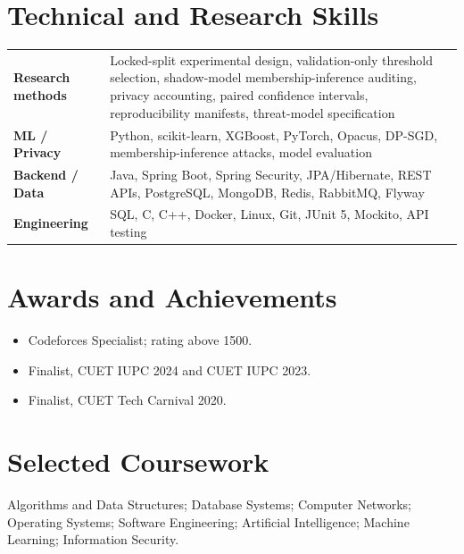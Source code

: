 \documentclass[11pt,letterpaper]{article}
\begin{document}
\section*{Technical and Research Skills}

\begin{tabularx}{\textwidth}{@{}>{\bfseries}p{} X@{}}
Research methods &
Locked-split experimental design, validation-only threshold selection,
shadow-model membership-inference auditing, privacy accounting, paired
confidence intervals, reproducibility manifests, threat-model specification \\[1pt]
ML / Privacy &
Python, scikit-learn, XGBoost, PyTorch, Opacus, DP-SGD, membership-inference
attacks, model evaluation \\[1pt]
Backend / Data &
Java, Spring Boot, Spring Security, JPA/Hibernate, REST APIs, PostgreSQL,
MongoDB, Redis, RabbitMQ, Flyway \\[1pt]
Engineering &
SQL, C, C++, Docker, Linux, Git, JUnit 5, Mockito, API testing
\end{tabularx}

\section*{Awards and Achievements}

\begin{itemize}
  \item Codeforces Specialist; rating above 1500.
  \item Finalist, CUET IUPC 2024 and CUET IUPC 2023.
  \item Finalist, CUET Tech Carnival 2020.
\end{itemize}

\section*{Selected Coursework}

Algorithms and Data Structures; Database Systems; Computer Networks; Operating
Systems; Software Engineering; Artificial Intelligence; Machine Learning;
Information Security.
\end{document}

